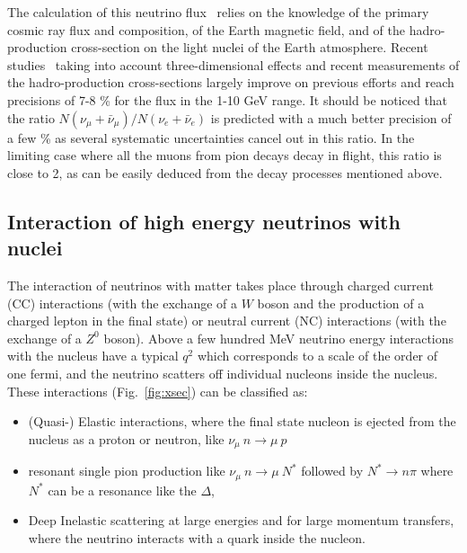 The calculation of this neutrino flux~\cite{Gaisser:2002jj} relies on the knowledge of the primary cosmic ray flux and composition, of the Earth magnetic field, and of the hadro-production cross-section on the light nuclei of the Earth atmosphere. Recent studies~\cite{PhysRevD.83.123001,Barr:2004br,Battistoni:2002ew,honda2015} taking into account three-dimensional effects and recent measurements of the hadro-production cross-sections largely improve on previous efforts and reach precisions of 7-8 \% for the flux in the 1-10 GeV range. It should be noticed that the ratio $N(\nu_\mu + \bar{\nu}_\mu)/N(\nu_e + \bar{\nu}_e)$ is predicted with a much better precision of a few \% as several systematic uncertainties cancel out in this ratio. In the limiting case where all the muons from pion decays decay in flight, this ratio is close to 2, as can be easily deduced from the decay processes mentioned above.


\subsection{Interaction of high energy neutrinos with nuclei}

The interaction of neutrinos with matter takes place through charged current (CC) interactions (with the exchange of a $W$ boson and the production of a charged lepton in the final state) or neutral current (NC) interactions (with the exchange of a $Z^0$ boson). 
Above a few hundred MeV neutrino energy interactions with the nucleus have a typical $q^2$ which corresponds to a scale of the order of one fermi, and the neutrino scatters off individual nucleons inside the nucleus. These interactions (Fig.~\ref{fig:xsec}) can be classified as:
\begin{itemize}
  \item (Quasi-) Elastic interactions, where the final state nucleon is ejected from the nucleus as a proton or neutron, like $\nu_\mu \: n \rightarrow \mu \: p$
  \item resonant single pion production like 
  $\nu_\mu \: n \rightarrow \mu \: N^*$ followed by $N^* \rightarrow n \pi$ 
  where $N^*$ can be  a resonance like the $\Delta$,
  \item Deep Inelastic scattering at large energies and for large momentum transfers, where the neutrino interacts with a quark inside the nucleon.
  \end{itemize}  


